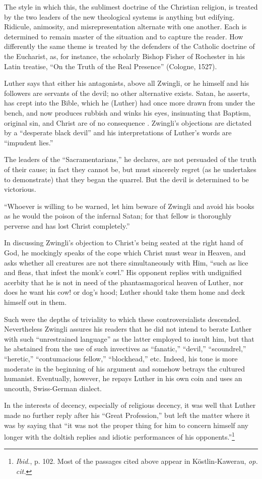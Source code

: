 The style in which this, the sublimest doctrine of the Christian
religion, is treated by the two leaders of the new theological systems
is anything but edifying. Ridicule, animosity, and misrepresentation
alternate with one another. Each is determined to remain master of the
situation and to capture the reader. How differently the same theme
is treated by the defenders of the Catholic doctrine of the Eucharist,
as, for instance, the scholarly Bishop Fisher of Rochester in his Latin
treatise, “On the Truth of the Real Presence” (Cologne, 1527).

Luther says that either his antagonists, above all Zwingli, or he himself
and his followers are servants of the devil; no other alternative exists. Satan,
he asserts, has crept into the Bible, which he (Luther) had once more
drawn from under the bench, and now produces rubbish and winks his
eyes, insinuating that Baptism, original sin, and Christ are of no consequence
. Zwingli’s objections are dictated by a “desperate black devil” and
his interpretations of Luther’s words are “impudent lies.”

The leaders of the “Sacramentarians,” he declares, are not persuaded of
the truth of their cause; in fact they cannot be, but must sincerely regret
(as he undertakes to demonstrate) that they began the quarrel. But the devil
is determined to be victorious.

“Whoever is willing to be warned, let him beware of Zwingli and avoid
his books as he would the poison of the infernal Satan; for that fellow is
thoroughly perverse and has lost Christ completely.”

In discussing Zwingli’s objection to Christ’s being seated at the right hand
of God, he mockingly speaks of the cope which Christ must wear in Heaven,
and asks whether all creatures are not there simultaneously with Him, “such
as lice and fleas, that infest the monk’s cowl.” His opponent replies with
undignified acerbity that he is not in need of the phantasmagorical heaven of
Luther, nor does he want his cow! or dog’s hood; Luther should take them
home and deck himself out in them.

Such were the depths of triviality to which these controversialists descended.
Nevertheless Zwingli assures his readers that he did not intend to
berate Luther with such “unrestrained language” as the latter employed to
insult him, but that he abstained from the use of such invectives as “fanatic,”
“devil,” “scoundrel,” ``heretic,'' “contumacious fellow,” “blockhead,” etc.
Indeed, his tone is more moderate in the beginning of his argument and
somehow betrays the cultured humanist. Eventually, however, he repays Luther
in his own coin and uses an uncouth, Swiss-German dialect.

In the interests of decency, especially of religious decency, it was
well that Luther made no further reply after his “Great Profession,”
but left the matter where it was by saying that “it was not the
proper thing for him to concern himself any longer with the doltish
replies and idiotic performances of his opponents.”\footnote
{\textit{Ibid.}, p. 102. Most of the passages cited above appear in Köstlin-Kawerau, \textit{op. cit.}}
